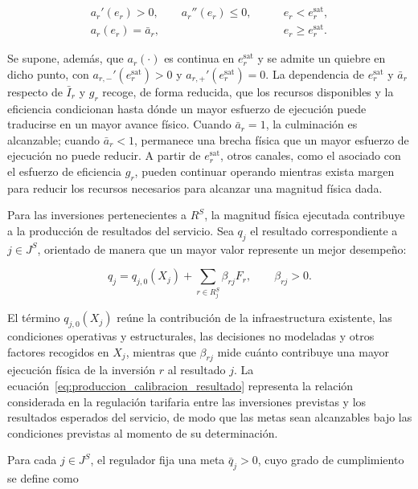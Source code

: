 \begin{equation}
\label{eq:saturacion_probabilidad}
\begin{aligned}
a_r'(e_r)>0,\qquad a_r''(e_r)\leq0,
&\qquad e_r<e_r^{\mathrm{sat}},
\\
a_r(e_r)=\bar a_r,
&\qquad e_r\geq e_r^{\mathrm{sat}}.
\end{aligned}
\end{equation}

Se supone, además, que \(a_r(\cdot)\) es continua en \(e_r^{\mathrm{sat}}\) y se admite un quiebre en dicho punto, con \(a_{r,-}'(e_r^{\mathrm{sat}})>0\) y \(a_{r,+}'(e_r^{\mathrm{sat}})=0\). La dependencia de \(e_r^{\mathrm{sat}}\) y \(\bar a_r\) respecto de \(\bar I_r\) y \(g_r\) recoge, de forma reducida, que los recursos disponibles y la eficiencia condicionan hasta dónde un mayor esfuerzo de ejecución puede traducirse en un mayor avance físico. Cuando \(\bar a_r=1\), la culminación es alcanzable; cuando \(\bar a_r<1\), permanece una brecha física que un mayor esfuerzo de ejecución no puede reducir. A partir de \(e_r^{\mathrm{sat}}\), otros canales, como el asociado con el esfuerzo de eficiencia \(g_r\), pueden continuar operando mientras exista margen para reducir los recursos necesarios para alcanzar una magnitud física dada.

Para las inversiones pertenecientes a \(R^{S}\), la magnitud física ejecutada contribuye a la producción de resultados del servicio. Sea \(q_j\) el resultado correspondiente a \(j\in J^{S}\), orientado de manera que un mayor valor represente un mejor desempeño:

\begin{equation}
\label{eq:produccion_calibracion_resultado}
q_j
=
q_{j,0}(X_j)
+
\sum_{r\in R_j^{S}}
\beta_{rj}F_r,
\qquad
\beta_{rj}>0.
\end{equation}

El término \(q_{j,0}(X_j)\) reúne la contribución de la infraestructura existente, las condiciones operativas y estructurales, las decisiones no modeladas y otros factores recogidos en \(X_j\), mientras que \(\beta_{rj}\) mide cuánto contribuye una mayor ejecución física de la inversión \(r\) al resultado \(j\). La ecuación~\eqref{eq:produccion_calibracion_resultado} representa la relación considerada en la regulación tarifaria entre las inversiones previstas y los resultados esperados del servicio, de modo que las metas sean alcanzables bajo las condiciones previstas al momento de su determinación.

Para cada \(j\in J^{S}\), el regulador fija una meta \(\bar q_j>0\), cuyo grado de cumplimiento se define como

